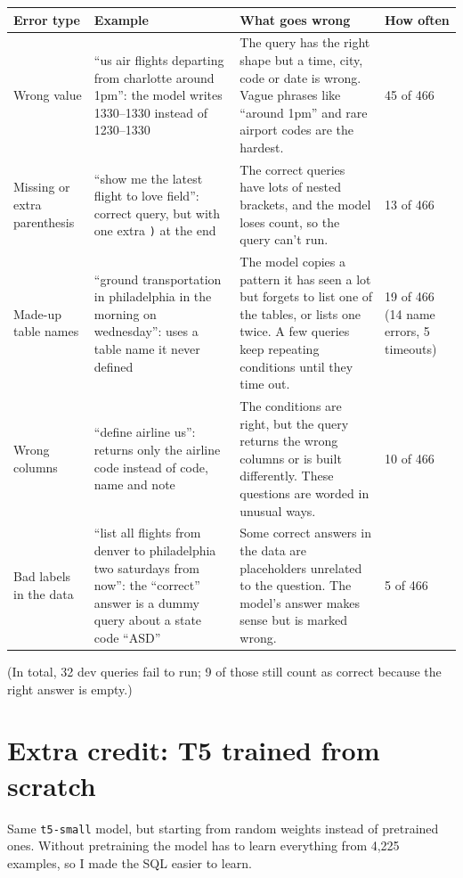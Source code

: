 \documentclass[11pt]{article}
\newcommand{\code}[1]{\texttt{#1}}
\begin{document}
\begin{table}[H]
\centering\small
\begin{tabular}{|P{2.4cm}|P{4.6cm}|P{5.5cm}|P{2.2cm}|}
\hline
\textbf{Error type} & \textbf{Example} & \textbf{What goes wrong} & \textbf{How often} \\ \hline
Wrong value &
``us air flights departing from charlotte around 1pm'': the model writes 1330--1330 instead of
1230--1330 &
The query has the right shape but a time, city, code or date is wrong. Vague phrases like
``around 1pm'' and rare airport codes are the hardest. &
45 of 466 \\ \hline
Missing or extra parenthesis &
``show me the latest flight to love field'': correct query, but with one extra \code{)} at the
end &
The correct queries have lots of nested brackets, and the model loses count, so the query can't
run. &
13 of 466 \\ \hline
Made-up table names &
``ground transportation in philadelphia in the morning on wednesday'': uses a table name it never
defined &
The model copies a pattern it has seen a lot but forgets to list one of the tables, or lists one
twice. A few queries keep repeating conditions until they time out. &
19 of 466 (14 name errors, 5 timeouts) \\ \hline
Wrong columns &
``define airline us'': returns only the airline code instead of code, name and note &
The conditions are right, but the query returns the wrong columns or is built differently.
These questions are worded in unusual ways. &
10 of 466 \\ \hline
Bad labels in the data &
``list all flights from denver to philadelphia two saturdays from now'': the ``correct'' answer is
a dummy query about a state code ``ASD'' &
Some correct answers in the data are placeholders unrelated to the question. The model's answer
makes sense but is marked wrong. &
5 of 466 \\ \hline
\end{tabular}
\end{table}

(In total, 32 dev queries fail to run; 9 of those still count as correct because the right answer
is empty.)

\section*{Extra credit: T5 trained from scratch}

Same \code{t5-small} model, but starting from random weights instead of pretrained ones. Without
pretraining the model has to learn everything from 4,225 examples, so I made the SQL easier to
learn.
\end{document}
